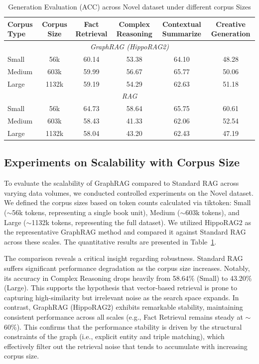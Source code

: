 \documentclass{article} %
\begin{document}
\begin{table}[ht]
\centering
\scriptsize
\caption{Generation Evaluation (ACC) across Novel dataset under different corpus Sizes}
\label{tab:corpus_size_comparison}
\setlength{\tabcolsep}{6pt}

\begin{tabular}{lccccc}
\toprule
Corpus Type & Corpus Size & Fact Retrieval & Complex Reasoning & Contextual Summarize & Creative Generation \\
\midrule

\multicolumn{6}{c}{\cellcolor[HTML]{EFEFEF}\textit{GraphRAG (HippoRAG2)}} \\
Small  & 56k   & 60.14 & 53.38 & 64.10 & 48.28 \\
Medium & 603k  & 59.99 & 56.67 & 65.77 & 50.06 \\
Large  & 1132k & 59.19 & 54.29 & 62.63 & 51.18 \\[3pt]

\multicolumn{6}{c}{\cellcolor[HTML]{EFEFEF}\textit{RAG}} \\
Small  & 56k   & 64.73 & 58.64 & 65.75 & 60.61 \\
Medium & 603k  & 58.43 & 41.33 & 62.06 & 52.54 \\
Large  & 1132k & 58.04 & 43.20 & 62.43 & 47.19 \\
\bottomrule
\end{tabular}

\end{table}


\subsection{Experiments on Scalability with Corpus Size}
To evaluate the scalability of GraphRAG compared to Standard RAG across varying data volumes, we conducted controlled experiments on the Novel dataset. We defined the corpus sizes based on token counts calculated via tiktoken: Small ($\sim$56k tokens, representing a single book unit), Medium ($\sim$603k tokens), and Large ($\sim$1132k tokens, representing the full dataset). We utilized HippoRAG2 as the representative GraphRAG method and compared it against Standard RAG across these scales. The quantitative results are presented in Table~\ref{tab:corpus_size_comparison}.

The comparison reveals a critical insight regarding robustness. Standard RAG suffers significant performance degradation as the corpus size increases. Notably, its accuracy in Complex Reasoning drops heavily from 58.64\% (Small) to 43.20\% (Large). This supports the hypothesis that vector-based retrieval is prone to capturing high-similarity but irrelevant noise as the search space expands. In contrast, GraphRAG (HippoRAG2) exhibits remarkable stability, maintaining consistent performance across all scales (e.g., Fact Retrieval remains steady at $\sim$60\%). This confirms that the performance stability is driven by the structural constraints of the graph (i.e., explicit entity and triple matching), which effectively filter out the retrieval noise that tends to accumulate with increasing corpus size.
\end{document}
